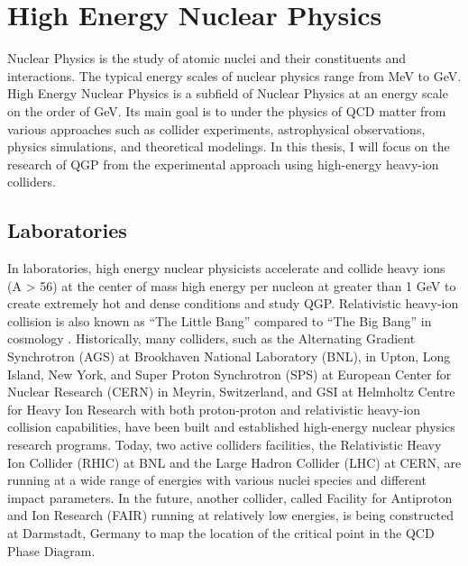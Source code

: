 






\section{High Energy Nuclear Physics}

Nuclear Physics is the study of atomic nuclei and their constituents and interactions. The typical energy scales of nuclear physics range from MeV to GeV. High Energy Nuclear Physics is a subfield of Nuclear Physics at an energy scale on the order of GeV. Its main goal is to under the physics of QCD matter from various approaches such as collider experiments, astrophysical observations, physics simulations, and theoretical modelings. In this thesis, I will focus on the research of QGP from the experimental approach using high-energy heavy-ion colliders.

\subsection{Laboratories}

In laboratories, high energy nuclear physicists accelerate and collide heavy ions (A > 56) at the center of mass high energy per nucleon at greater than 1 GeV to create extremely hot and dense conditions and study QGP. Relativistic heavy-ion collision is also known as ``The Little Bang'' compared to ``The Big Bang'' in cosmology \cite{LittleBang}. Historically, many colliders, such as the Alternating Gradient Synchrotron (AGS) at Brookhaven National Laboratory (BNL), in Upton, Long Island, New York, and Super Proton Synchrotron (SPS) at European Center for Nuclear Research (CERN) in Meyrin, Switzerland, and GSI at Helmholtz Centre for Heavy Ion Research with both proton-proton and relativistic heavy-ion collision capabilities, have been built and established high-energy nuclear physics research programs. Today, two active colliders facilities, the Relativistic Heavy Ion Collider (RHIC) at BNL and the Large Hadron Collider (LHC) at CERN, are running at a wide range of energies with various nuclei species and different impact parameters. In the future, another collider, called Facility for Antiproton and Ion Research (FAIR) running at relatively low energies, is being constructed at Darmstadt, Germany to map the location of the critical point in the QCD Phase Diagram. 


